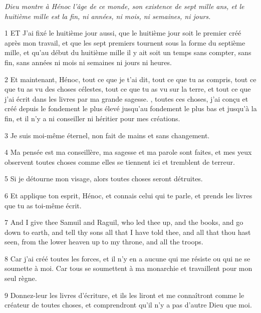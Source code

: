 \par \textit{Dieu montre à Hénoc l'âge de ce monde, son existence de sept mille ans, et le huitième mille est la fin, ni années, ni mois, ni semaines, ni jours.}

\par 1 ET J'ai fixé le huitième jour aussi, que le huitième jour soit le premier créé après mon travail, et que les sept premiers tournent sous la forme du septième mille, et qu'au début du huitième mille il y ait soit un temps sans compter, sans fin, sans années ni mois ni semaines ni jours ni heures.

\par 2 Et maintenant, Hénoc, tout ce que je t'ai dit, tout ce que tu as compris, tout ce que tu as vu des choses célestes, tout ce que tu as vu sur la terre, et tout ce que j'ai écrit dans les livres par ma grande sagesse. , toutes ces choses, j'ai conçu et créé depuis le fondement le plus élevé jusqu'au fondement le plus bas et jusqu'à la fin, et il n'y a ni conseiller ni héritier pour mes créations.

\par 3 Je suis moi-même éternel, non fait de mains et sans changement.

\par 4 Ma pensée est ma conseillère, ma sagesse et ma parole sont faites, et mes yeux observent toutes choses comme elles se tiennent ici et tremblent de terreur.

\par 5 Si je détourne mon visage, alors toutes choses seront détruites.

\par 6 Et applique ton esprit, Hénoc, et connais celui qui te parle, et prends les livres que tu as toi-même écrit.

\par 7 And I give thee Samuil and Raguil, who led thee up, and the books, and go down to earth, and tell thy sons all that I have told thee, and all that thou hast seen, from the lower heaven up to my throne, and all the troops.

\par 8 Car j'ai créé toutes les forces, et il n'y en a aucune qui me résiste ou qui ne se soumette à moi. Car tous se soumettent à ma monarchie et travaillent pour mon seul règne.

\par 9 Donnez-leur les livres d'écriture, et ils les liront et me connaîtront comme le créateur de toutes choses, et comprendront qu'il n'y a pas d'autre Dieu que moi.

